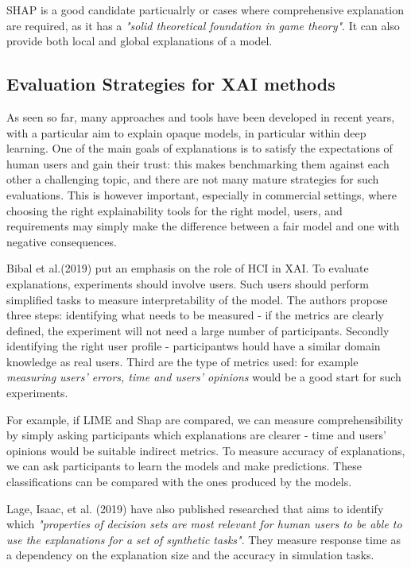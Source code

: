 \documentclass[proposal]{softeng}
\begin{document}
SHAP is a good candidate particualrly or cases where comprehensive explanation are required, as it has a \textit{"solid theoretical foundation in game theory"}\cite{molnar2019}. It can also provide both local and global explanations of a model.

\subsection{Evaluation Strategies for XAI methods}
As seen so far, many approaches and tools have been developed in recent years, with a particular aim to explain opaque models, in particular within deep learning. One of the main goals of explanations is to satisfy the expectations of human users and gain their trust:  this makes benchmarking them against each other a challenging topic, and there are not many mature strategies for such evaluations. This is however important, especially in commercial settings, where choosing the right explainability tools for the right model, users, and requirements may simply make the difference between a fair model and one with negative consequences.


Bibal et al.(2019) \cite{bibal2019user} put an emphasis on the role of HCI in XAI. To evaluate explanations, experiments should involve users. Such users should perform simplified tasks to measure interpretability of the model. The authors propose three steps: identifying what needs to be measured - if the metrics are clearly defined, the experiment will not need a large number of participants. Secondly identifying the right user profile - participantws hould have a similar domain knowledge as real users. Third are the type of metrics used: for example \textit{measuring users’ errors, time and users’ opinions} would be a good start for such experiments. 

For example, if LIME and Shap are compared, we can measure comprehensibility by simply asking participants which explanations are clearer - time and users' opinions would be suitable indirect metrics. To measure accuracy of explanations, we can ask participants to learn the models and make predictions. These classifications can be compared with the ones produced by the models.

Lage, Isaac, et al. (2019) \cite{LageIsaac2019AEot} have also published researched  that aims to identify which \textit{"properties of decision sets are most relevant for human users to be able to use the explanations for a set of synthetic tasks"}. They  measure response time as a dependency on the explanation size and the accuracy in simulation tasks.
\end{document}
